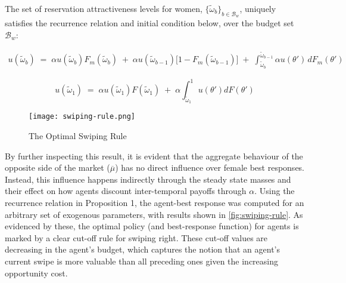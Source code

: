 \begin{proposition}
The set of reservation attractiveness levels for women, $\{\tilde\omega_b\}_{b\in \mathcal{B}_w}$, uniquely satisfies the recurrence relation and initial condition below, over the budget set $\mathcal{B}_w$: 

\begin{equation}\label{eq:recurrence relation}
    \begin{aligned}
        u(\widetilde \omega_b) \;=\; \alpha u(\widetilde \omega_b) F_m(\widetilde \omega_b) \;+\; \alpha u(\widetilde \omega_{b-1}) \Big[1- F_m(\widetilde \omega_{b-1})\Big] \;+\; \int^{\widetilde \omega_{b-1}}_{\widetilde \omega_b} \alpha u(\theta')\,dF_m(\theta')
    \end{aligned} 
\end{equation} 

\begin{equation}\label{eq:initial condition}
    u(\widetilde\omega_1) \;=\; \alpha u(\widetilde\omega_1)F(\widetilde\omega_1) \;+\; \alpha \int^1_{\widetilde\omega_1}u(\theta')dF(\theta')
\end{equation}
\end{proposition} 

\begin{figure}[ht]
    \centering
    \caption{The Optimal Swiping Rule}
    \texttt{[image: swiping-rule.png]}
    \label{fig:swiping-rule} 
\end{figure}

By further inspecting this result, it is evident that the aggregate behaviour of the opposite side of the market ($\overline\mu$) has no direct influence over female best responses. Instead, this influence happens indirectly through the steady state masses and their effect on how agents discount inter-temporal payoffs through $\alpha$. Using the recurrence relation in Proposition 1, the agent-best response was computed for an arbitrary set of exogenous parameters, with results shown in \autoref{fig:swiping-rule}. As evidenced by these, the optimal policy (and best-response function) for agents is marked by a clear cut-off rule for swiping right. These cut-off values are decreasing in the agent's budget, which captures the notion that an agent's current swipe is more valuable than all preceding ones given the increasing opportunity cost.  
